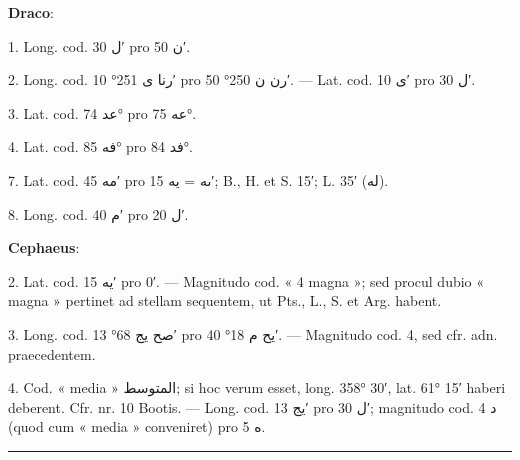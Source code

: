 \documentclass[11pt]{article}
\newcommand{\AbjadZero}{{\NallinoSigns\symbol{"E000}}}
\begin{document}
{\small
\par\hspace*{8mm}\textbf{Draco}:
\par\hangindent=12mm 1. Long. cod. \textarabic{ل} 30′ pro \textarabic{ن} 50′.
\par\hangindent=12mm 2. Long. cod. \textarabic{رنا ى} 251° 10′ pro \textarabic{رن ن} 250° 50′. — Lat. cod. \textarabic{ى} 10′ pro \textarabic{ل} 30′.
\par\hangindent=12mm 3. Lat. cod. \textarabic{عد} 74° pro \textarabic{عه} 75°.
\par\hangindent=12mm 4. Lat. cod. \textarabic{فه} 85° pro \textarabic{فد} 84°.
\par\hangindent=12mm 7. Lat. cod. \textarabic{مه} 45′ pro \textarabic{ٮه} = \textarabic{يه} 15′; B., H. et S. 15′; L. 35′ (\textarabic{له}).
\par\hangindent=12mm 8. Long. cod. \textarabic{م} 40′ pro \textarabic{ل} 20′.
\par\hspace*{8mm}\textbf{Cephaeus}:
\par\hangindent=12mm 2. Lat. cod. \textarabic{يه} 15′ pro \textarabic{\AbjadZero{}} 0′. — Magnitudo cod. « 4 magna »; sed procul dubio « magna » pertinet ad stellam sequentem, ut Pts., L., S. et Arg. habent.
\par\hangindent=12mm 3. Long. cod. \textarabic{صح يج} 68° 13′ pro \textarabic{يح م} 18° 40′. — Magnitudo cod. 4, sed cfr. adn. praecedentem.
\par\hangindent=12mm 4. Cod. « media » \textarabic{المتوسط}; si hoc verum esset, long. 358° 30′, lat. 61° 15′ haberi deberent. Cfr. nr. 10 Bootis. — Long. cod. \textarabic{يج} 13′ pro \textarabic{ل} 30′; magnitudo cod. \textarabic{د} 4 (quod cum « media » conveniret) pro \textarabic{ه} 5.
\par}
\clearpage
\noindent{}\par\vspace{-1mm}\noindent\rule{\textwidth}{.4pt}\par\vspace{2mm}
\end{document}

